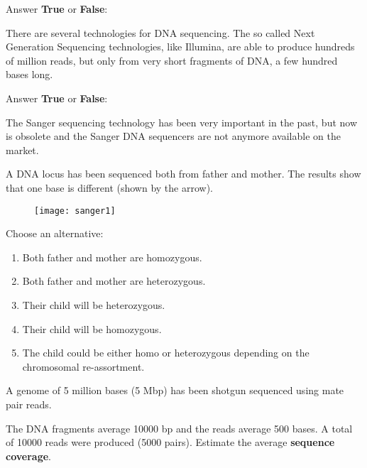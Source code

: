 \begin{Exercise} [
  title={NGS},
  difficulty={1},
  label={ex14},
  origin={G. Valle}
 ]

Answer \textbf{True} or \textbf{False}:

  \Question There are several technologies for DNA sequencing.
The so called Next Generation Sequencing technologies, like Illumina, are able
to produce hundreds of million reads, but only from very short fragments of
DNA, a few hundred bases long.

\end{Exercise}

\begin{Exercise} [
  title={Sanger Sequencing},
  difficulty={1},
  label={ex15},
  origin={G. Valle}
 ]

Answer \textbf{True} or \textbf{False}:

  \Question The Sanger sequencing technology has been very important in the
past, but now is obsolete and the Sanger DNA sequencers are not anymore
available on the market.

\end{Exercise}

\begin{Exercise} [
  title={DNA Analysis},
  difficulty={1},
  label={ex16},
  origin={G. Valle}
 ]

A DNA locus has been sequenced both from father and mother.
The results show that one base is different (shown by the arrow).

 \begin{figure}[H]
  \centering
  \texttt{[image: sanger1]}
 \end{figure}

Choose an alternative:

\begin{enumerate}
  \item Both father and mother are homozygous.
  \item Both father and mother are heterozygous.
  \item Their child will be heterozygous.
  \item Their child will be homozygous.
  \item The child could be either homo or heterozygous depending on the
chromosomal re-assortment.
\end{enumerate}

\end{Exercise}

\begin{Exercise} [
  title={Sequence coverage},
  difficulty={1},
  label={ex17},
  origin={G. Valle}
 ]

  \Question A genome of 5 million bases (5 Mbp) has been shotgun sequenced
using mate pair reads.

The DNA fragments average 10000 bp and the reads average 500 bases.
A total of 10000 reads were produced (5000 pairs). Estimate the average
\textbf{sequence coverage}.

\end{Exercise}

